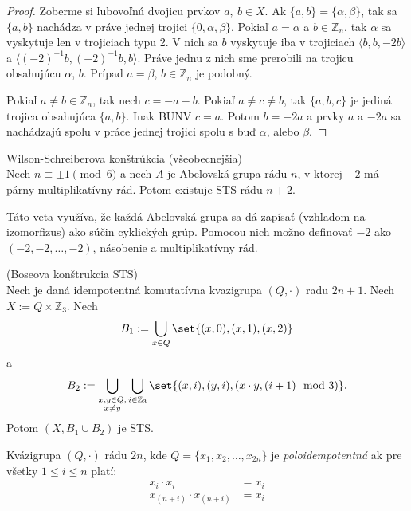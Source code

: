 \begin{proof}
	Zoberme si ľubovoľnú dvojicu prvkov $a,\ b \in X$. Ak $\{ a, b \} = \{ \alpha, \beta \}$, tak sa $\{a, b\}$ nachádza v práve jednej trojici $\{0, \alpha, \beta \}$. Pokiaľ $a = \alpha$ a $b \in \mathbb{Z}_n$, tak $\alpha$ sa vyskytuje len v trojiciach typu 2. V nich sa $b$ vyskytuje iba v trojiciach $\langle b, b, -2b \rangle$ a $\langle (-2)^{-1}b, (-2)^{-1}b, b \rangle$. Práve jednu z nich sme prerobili na trojicu obsahujúcu $\alpha$, $b$. Prípad $a = \beta$, $b \in \mathbb{Z}_n$ je podobný.
	
	Pokiaľ $a \ne b \in \mathbb{Z}_n$, tak nech $c = - a - b$. Pokiaľ $a \ne c \ne b$, tak $\{a, b, c\}$ je jediná trojica obsahujúca $\{a, b\}$. Inak BUNV $c = a$. Potom $b = -2a$ a prvky $a$ a $-2a$ sa nachádzajú spolu v práce jednej trojici spolu s buď $\alpha$, alebo $\beta$.
\end{proof}

\begin{theorem_hard}{Wilson-Schreiberova konštrúkcia (všeobecnejšia)}\\
	Nech $n \equiv \pm 1 \pmod{6}$ a nech $A$ je Abelovská grupa rádu $n$, v ktorej $-2$ má párny multiplikatívny rád. Potom existuje STS rádu $n + 2$. 
\end{theorem_hard}

Táto veta využíva, že každá Abelovská grupa sa dá zapísať (vzhľadom na izomorfizus) ako súčin cyklických grúp. Pomocou nich možno definovať $-2$ ako $(-2,-2, \dots, -2)$, násobenie a multiplikatívny rád.

\begin{theorem_hard}{(Boseova konštrukcia STS)}\\
\label{th:bose}
Nech je daná idempotentná komutatívna kvazigrupa $(Q, \cdot)$ radu $2n + 1$.
Nech $X := Q \times \mathbb{Z}_3$.
Nech $$B_1 := \bigcup_{x \in Q} \set{(x, 0), (x, 1), (x, 2)}$$ a $$B_2 := \bigcup_{\substack{x, y \in Q,\\ x \neq y}}\bigcup_{i \in \mathbb{Z}_3} \set{(x, i), (y, i), (x \cdot y, (i+1) \mod 3)}.$$
Potom $(X, B_1 \cup B_2)$ je STS.
\end{theorem_hard}

\begin{definition}
Kvázigrupa $(Q,\cdot)$ rádu $2n$, kde $Q=\{x_1,x_2,\dots, x_{2n}\}$ je \textit{poloidempotentná} ak pre všetky $1\leq i\leq n$ platí:
\begin{align*}
	x_i\cdot x_i &= x_i\\
	x_{(n+i)}\cdot x_{(n+i)} &= x_i
\end{align*}
\end{definition}

